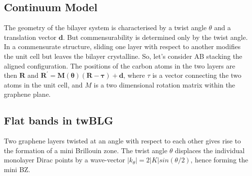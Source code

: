\subsection{Continuum Model}
The geometry of the bilayer system is characterised by a twist angle $\theta$ and a translation vector $\boldsymbol{d}$. But commensurability is determined only by the twist angle. In a commensurate structure, sliding one layer with respect to another modifies the unit cell but leaves the bilayer crystalline. So, let's consider AB stacking the aligned configuration. The positions of the carbon atoms in the two layers are then $\boldsymbol{R}$ and $\boldsymbol{R^\prime = M(\theta)(\boldsymbol{R}-\tau)+\boldsymbol{d}}$, where $\tau$ is a vector connecting the two atoms in the unit cell, and $M$ is a two dimensional rotation matrix within the graphene plane.

\subsection{Flat bands in twBLG}
Two graphene layers twisted at an angle with respect to each other gives rise to the formation of a mini Brillouin zone. The twist angle $\theta$ displaces the individual monolayer Dirac points by a wave-vector $|k_\theta|=2|K|sin(\theta/2)$, hence forming the mini BZ.

